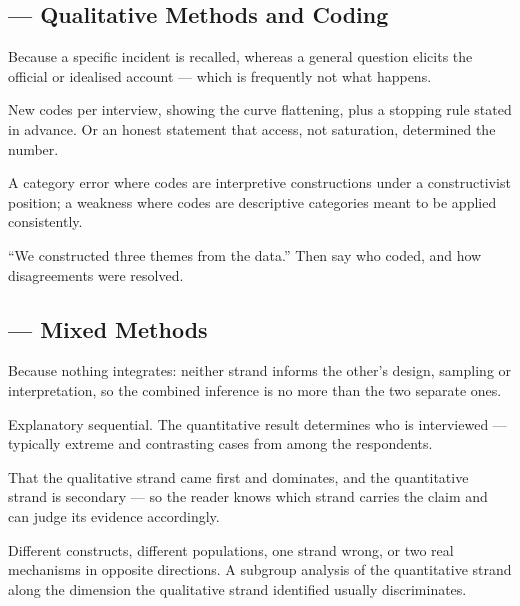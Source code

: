 \subsection*{ --- Qualitative Methods and Coding}
\begin{tightnum}
  \item Because a specific incident is recalled, whereas a general question
    elicits the official or idealised account --- which is frequently not what
    happens.
  \item New codes per interview, showing the curve flattening, plus a stopping
    rule stated in advance. Or an honest statement that access, not saturation,
    determined the number.
  \item A category error where codes are interpretive constructions under a
    constructivist position; a weakness where codes are descriptive categories
    meant to be applied consistently.
  \item ``We constructed three themes from the data.'' Then say who coded, and
    how disagreements were resolved.
\end{tightnum}

\subsection*{ --- Mixed Methods}
\begin{tightnum}
  \item Because nothing integrates: neither strand informs the other's design,
    sampling or interpretation, so the combined inference is no more than the
    two separate ones.
  \item Explanatory sequential. The quantitative result determines who is
    interviewed --- typically extreme and contrasting cases from among the
    respondents.
  \item That the qualitative strand came first and dominates, and the
    quantitative strand is secondary --- so the reader knows which strand
    carries the claim and can judge its evidence accordingly.
  \item Different constructs, different populations, one strand wrong, or two
    real mechanisms in opposite directions. A subgroup analysis of the
    quantitative strand along the dimension the qualitative strand identified
    usually discriminates.
\end{tightnum}

